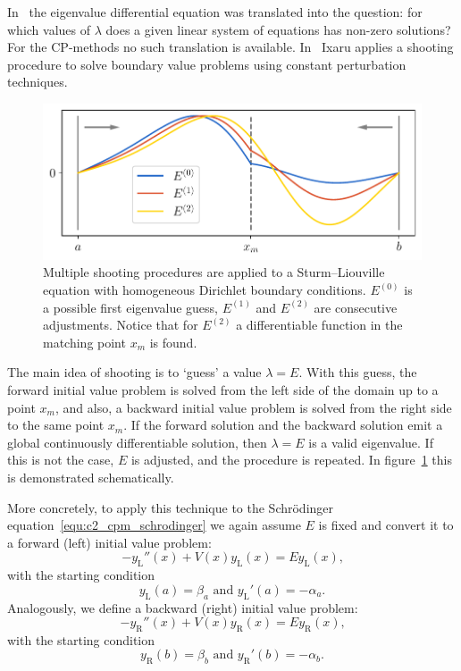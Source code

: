 In~\cite{canosa_new_1970} the eigenvalue differential equation was translated into the question: for which values of $\lambda$ does a given linear system of equations has non-zero solutions? For the CP-methods no such translation is available. In~\cite{ixaru_numerical_1984} Ixaru applies a shooting procedure to solve boundary value problems using constant perturbation techniques.

\begin{figure}
    \begin{center}
        \includegraphics[width=\linewidth]{img/chapter2/shooting_schematic.pdf}
        \caption{Multiple shooting procedures are applied to a Sturm--Liouville equation with homogeneous Dirichlet boundary conditions. $E^{(0)}$ is a possible first eigenvalue guess, $E^{(1)}$ and $E^{(2)}$ are consecutive adjustments. Notice that for $E^{(2)}$ a differentiable function in the matching point $x_m$ is found.}
        \label{fig:c2_shooting_schematic}
    \end{center}
\end{figure}

The main idea of shooting is to `guess' a value $\lambda = E$. With this guess, the forward initial value problem is solved from the left side of the domain up to a point $x_m$, and also, a backward initial value problem is solved from the right side to the same point $x_m$. If the forward solution and the backward solution emit a global continuously differentiable solution, then $\lambda = E$ is a valid eigenvalue. If this is not the case, $E$ is adjusted, and the procedure is repeated. In figure~\ref{fig:c2_shooting_schematic} this is demonstrated schematically.

More concretely, to apply this technique to the Schrödinger equation~\eqref{equ:c2_cpm_schrodinger} we again assume $E$ is fixed and convert it to a forward (left) initial value problem:
$$
    -y_\text{L}''(x) + V(x) y_\text{L}(x) = E y_\text{L}(x)\text{,}
$$
with the starting condition
$$
    y_\text{L}(a) = \beta_a \text{ and } y_\text{L}'(a) = -\alpha_a\text{.}
$$
Analogously, we define a backward (right) initial value problem:
$$
    -y_\text{R}''(x) + V(x) y_\text{R}(x) = E y_\text{R}(x)\text{,}
$$
with the starting condition
$$
    y_\text{R}(b) = \beta_b \text{ and } y_\text{R}'(b) = -\alpha_b\text{.}
$$

